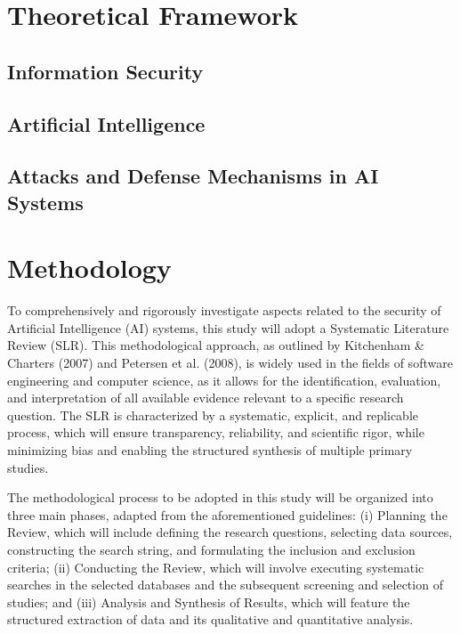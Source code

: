 \documentclass[twoside,brazilian,english]{UNISINOSmonografia}
\begin{document}
\chapter{Theoretical Framework}

\section{Information Security}

\section{Artificial Intelligence}

\section{Attacks and Defense Mechanisms in AI Systems}



\chapter{Methodology}

To comprehensively and rigorously investigate aspects related to the security of Artificial Intelligence (AI) systems, this study will adopt a Systematic Literature Review (SLR). This methodological approach, as outlined by Kitchenham \& Charters (2007) and Petersen et al. (2008), is widely used in the fields of software engineering and computer science, as it allows for the identification, evaluation, and interpretation of all available evidence relevant to a specific research question. The SLR is characterized by a systematic, explicit, and replicable process, which will ensure transparency, reliability, and scientific rigor, while minimizing bias and enabling the structured synthesis of multiple primary studies.

The methodological process to be adopted in this study will be organized into three main phases, adapted from the aforementioned guidelines: (i) Planning the Review, which will include defining the research questions, selecting data sources, constructing the search string, and formulating the inclusion and exclusion criteria; (ii) Conducting the Review, which will involve executing systematic searches in the selected databases and the subsequent screening and selection of studies; and (iii) Analysis and Synthesis of Results, which will feature the structured extraction of data and its qualitative and quantitative analysis.
\end{document}

